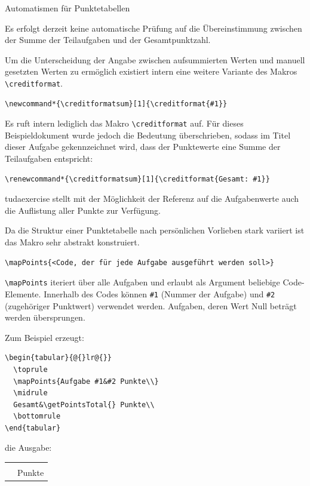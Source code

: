 \documentclass[
	ngerman,%
	accentcolor=9c,%
	points=true, für die Aktivierung der Punktereferenzen
]{tudaexercise}
\renewcommand*{\creditformatsum}[1]{\creditformat{Gesamt: #1}}
\newcommand*{\code}[1]{\texttt{#1}}
\newcommand*{\cls}[1]{\textsf{#1}}
\let\tbs\textbackslash
\begin{document}
\begin{task}[points=auto]{Automatismen für Punktetabellen}
\begin{subtask}[points=2,title={Punkte aus Teilaufgaben aufsummieren}]
		Es erfolgt derzeit keine automatische Prüfung auf die Übereinstimmung zwischen der Summe der Teilaufgaben und der Gesamtpunktzahl.

		Um die Unterscheidung der Angabe zwischen aufsummierten Werten und manuell gesetzten Werten zu ermöglich existiert intern eine weitere Variante des Makros \code{\tbs{}creditformat}.

\begin{verbatim}
\newcommand*{\creditformatsum}[1]{\creditformat{#1}}
\end{verbatim}

		Es ruft intern lediglich das Makro \code{\tbs{}creditformat} auf. Für dieses Beispieldokument wurde jedoch die Bedeutung überschrieben, sodass im Titel dieser Aufgabe gekennzeichnet wird, dass der Punktewerte eine Summe der Teilaufgaben entspricht:

\begin{verbatim}
\renewcommand*{\creditformatsum}[1]{\creditformat{Gesamt: #1}}
\end{verbatim}
	\end{subtask}

	\begin{subtask}[points=3,title={Automatische Punktetabellen}]
		\cls{tudaexercise} stellt mit der Möglichkeit der Referenz auf die Aufgabenwerte auch die Auflistung aller Punkte zur Verfügung.

		Da die Struktur einer Punktetabelle nach persönlichen Vorlieben stark variiert ist das Makro sehr abstrakt konstruiert.

\begin{verbatim}
\mapPoints{<Code, der für jede Aufgabe ausgeführt werden soll>}
\end{verbatim}

		\code{\tbs{}mapPoints} iteriert über alle Aufgaben und erlaubt als Argument beliebige Code-Elemente. Innerhalb des Codes können \code{\#1} (Nummer der Aufgabe) und \code{\#2} (zugehöriger Punktwert) verwendet werden.
		Aufgaben, deren Wert Null beträgt werden übersprungen.

		Zum Beispiel erzeugt:
\begin{verbatim}
\begin{tabular}{@{}lr@{}}
  \toprule
  \mapPoints{Aufgabe #1&#2 Punkte\\}
  \midrule
  Gesamt&\getPointsTotal{} Punkte\\
  \bottomrule
\end{tabular}
\end{verbatim}
		die Ausgabe:\\
		\begin{tabular}{@{}lr@{}}
			\toprule
			\mapPoints{Aufgabe #1&#2 Punkte\\}
			\midrule
			Gesamt&\getPointsTotal{} Punkte\\
			\bottomrule
		\end{tabular}


\end{subtask}
\end{task}
\end{document}
